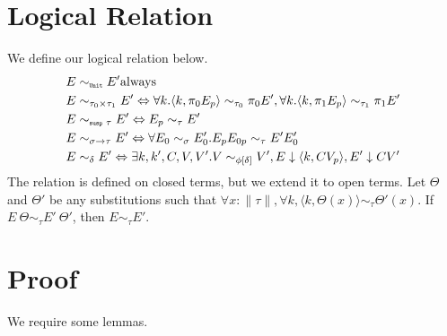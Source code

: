 \section{Logical Relation}
We define our logical relation below.
%
\begin{align*}
  E &\sim_{\texttt{\tiny{Unit}}} E' \text{always}  \\
  E &\sim_{\tau_0 \times \tau_1} E' \Leftrightarrow \forall k. \langle k, \pi_0 E_p\rangle \sim_{\tau_0} \pi_0 E', \forall k. \langle k, \pi_1 E_p\rangle \sim_{\tau_1} \pi_1 E' \\
  E &\sim_{\texttt{\tiny{susp }} \tau} E' \Leftrightarrow E_p \sim_\tau E' \\
  E &\sim_{\sigma \to \tau} E' \Leftrightarrow \forall E_0 \sim_\sigma E'_0. E_p E_{0p} \sim_\tau E' E'_0 \\
  E &\sim_\delta E' \Leftrightarrow \exists k, k', C, V, V'. V \sim_{\phi[\delta]} V', E \downarrow \langle k, C V_p \rangle, E' \downarrow C V'
\end{align*}
%
The relation is defined on closed terms, but we extend it to open terms.
Let $\Theta$ and $\Theta'$ be any substitutions such that $\forall x : \|\tau\|, \forall k, \langle k, \Theta(x) \rangle \sim_\tau \Theta'(x)$.
If $E\ \Theta \sim_\tau E'\ \Theta'$, then $E \sim_\tau E'$.

\section{Proof}

We require some lemmas.

